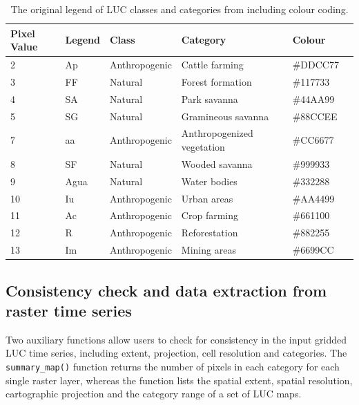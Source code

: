 \begin{table}[htbp]
\centering
\caption{The original legend of LUC classes and categories from \citet{sospantanal2015} including colour coding.}
\label{tab:legend_table}
\begin{tabular}[t]{llllll}
\hline
Pixel Value & Legend & Class      & Category                    & Colour \\
\hline
2        & Ap     & Anthropogenic & Cattle farming              & \#DDCC77 \\
3        & FF     & Natural       & Forest  formation           & \#117733 \\
4        & SA     & Natural       & Park savanna                & \#44AA99 \\
5        & SG     & Natural       & Gramineous savanna          & \#88CCEE \\
7        & aa     & Anthropogenic & Anthropogenized vegetation  & \#CC6677 \\
8        & SF     & Natural       & Wooded savanna              & \#999933 \\
9        & Agua   & Natural       & Water bodies                & \#332288 \\
10       & Iu     & Anthropogenic & Urban areas                 & \#AA4499 \\
11       & Ac     & Anthropogenic & Crop farming                & \#661100 \\
12       & R      & Anthropogenic & Reforestation               & \#882255 \\
13       & Im     & Anthropogenic & Mining areas                & \#6699CC \\
\hline
\end{tabular}
\end{table}

\hypertarget{consistency-check-and-data-extraction-from-raster-time-series}{%
\subsection{Consistency check and data extraction from raster time
series}\label{consistency-check-and-data-extraction-from-raster-time-series}}

Two auxiliary functions allow users to check for consistency in the
input gridded LUC time series, including extent, projection, cell
resolution and categories. The \texttt{summary\_map()} function returns
the number of pixels in each category for each single raster layer,
whereas the  function lists the spatial extent, spatial
resolution, cartographic projection and the category range of a set of
LUC maps.

